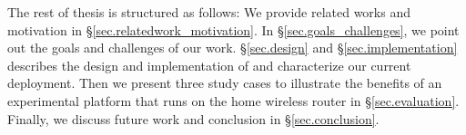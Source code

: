 The rest of thesis is structured as follows: We provide related works and motivation in \S{\ref{sec.relatedwork_motivation}}. In \S{\ref{sec.goals_challenges}}, we point out the goals and challenges of our work. \S{\ref{sec.design}} and \S{\ref{sec.implementation}} describes the design and implementation of \sysname and characterize our current deployment. Then we present three study cases to illustrate the benefits of an experimental platform that runs on the home wireless router in \S{\ref{sec.evaluation}}. Finally, we discuss future work and conclusion in \S{\ref{sec.conclusion}}. 